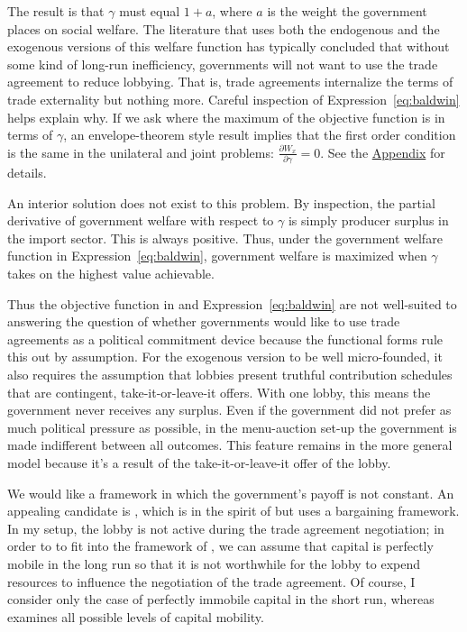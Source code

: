 \documentclass[12pt,titlepage]{article}
\newcommand{\ga}{\gamma}
\begin{document}
The \Textcite{gh94} result is that $\ga$ must equal $1+a$, where $a$ is the weight the government places on social welfare. The literature that uses both the endogenous and the exogenous versions of this welfare function has typically concluded that without some kind of long-run inefficiency, governments will not want to use the trade agreement to reduce lobbying. That is, trade agreements internalize the terms of trade externality but nothing more. Careful inspection of Expression~\ref{eq:baldwin} helps explain why. If we ask where the maximum of the objective function is in terms of $\ga$, an envelope-theorem style result implies that the first order condition is the same in the unilateral and joint problems: $\displaystyle \frac{\partial W_x}{\partial \ga} = 0$. See the \hyperlink{envelope}{Appendix} for details.

An interior solution does not exist to this problem. By inspection, the partial derivative of government welfare with respect to $\ga$ is simply producer surplus in the import sector. This is always positive. Thus, under the government welfare function in Expression~\ref{eq:baldwin}, government welfare is maximized when $\ga$ takes on the highest value achievable.

Thus the objective function in \Textcite{gh94} and Expression~\ref{eq:baldwin} are not well-suited to answering the question of whether governments would like to use trade agreements as a political commitment device because the functional forms rule this out by assumption. For the exogenous version to be well micro-founded, it also requires the assumption that lobbies present truthful contribution schedules that are contingent, take-it-or-leave-it offers. With one lobby, this means the government never receives any surplus. Even if the government did not prefer as much political pressure as possible, in the menu-auction set-up the government is made indifferent between all outcomes. This feature remains in the more general \Textcite{dgh97} model because it's a result of the take-it-or-leave-it offer of the lobby.

We would like a framework in which the government's payoff is not constant. An appealing candidate is \Textcite{mrc2007}, which is in the spirit of \Textcite{gh94} but uses a bargaining framework. In my setup, the lobby is not active during the trade agreement negotiation; in order to to fit into the framework of \Textcite{mrc2007}, we can assume that capital is perfectly mobile in the long run so that it is not worthwhile for the lobby to expend resources to influence the negotiation of the trade agreement. Of course, I consider only the case of perfectly immobile capital in the short run, whereas \Textcite{mrc2007} examines all possible levels of capital mobility.
\end{document}
